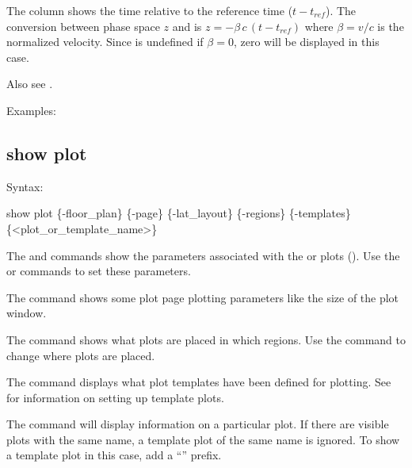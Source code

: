 {{{{{{{{{The  column shows the time relative to the reference time ($t - t_{ref}$). The conversion
between phase space $z$ and  is $z = -\beta \, c \, (t - t_{ref})$ where $\beta = v/c$ is
the normalized velocity. Since  is undefined if $\beta = 0$, zero will be displayed in
this case.

Also see .

Examples:


\subsection{show plot}
\label{s:show.plot}

Syntax:
\begin{example}
  show plot \{-floor_plan\} \{-page\} \{-lat_layout\} \{-regions\} 
            \{-templates\} \{<plot_or_template_name>\}
\end{example}

The  and  commands show the parameters
associated with the  or  plots (). Use the  or  commands to set these parameters.

The  command shows some plot page plotting parameters like the size of the plot
window.

The  command shows what plots are placed in which regions. Use the 
command to change where plots are placed.

The  command displays what plot templates have been defined for plotting.
See  for information on setting up template plots.

The  command will display information on a particular plot. If
there are visible plots with the same name, a template plot of the same name is ignored. To show a
template plot in this case, add a ``'' prefix.

}}}}}}}}}

